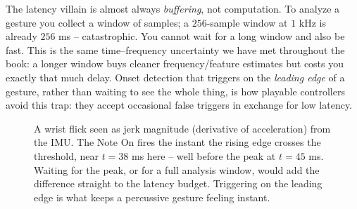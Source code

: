 \begin{trapbox}
The latency villain is almost always \emph{buffering}, not computation. To analyze a gesture you
collect a window of samples; a $256$-sample window at $1$ kHz is already $256$ ms -- catastrophic. You
cannot wait for a long window and also be fast. This is the same time--frequency uncertainty we have
met throughout the book: a longer window buys cleaner frequency/feature estimates but costs you
exactly that much delay. Onset detection that triggers on the \emph{leading edge} of a gesture,
rather than waiting to see the whole thing, is how playable controllers avoid this trap: they accept
occasional false triggers in exchange for low latency.
\end{trapbox}

\begin{figure}[H]
\centering
{}
\caption{A wrist flick seen as jerk magnitude (derivative of acceleration) from the IMU. The Note On
fires the instant the rising edge crosses the threshold, near $t=38$ ms here -- well before the peak at
$t=45$ ms. Waiting for the peak, or for a full analysis window, would add the difference straight to
the latency budget. Triggering on the leading edge is what keeps a percussive gesture feeling
instant.}
\label{ch29:fig-onset}
\end{figure}

